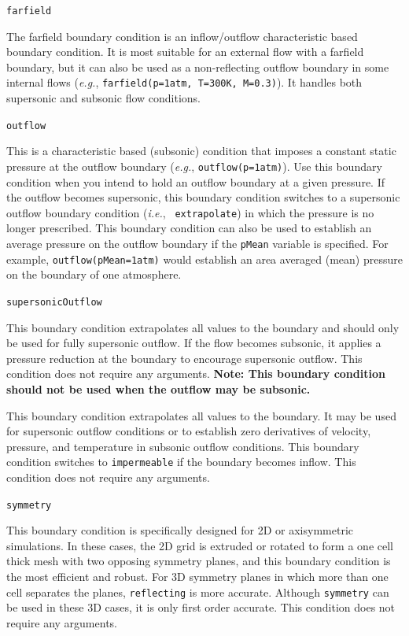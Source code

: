 \documentclass{article}
\begin{document}
\begin{list}{}{}
  \item {\tt farfield}

    The farfield boundary condition is an inflow/outflow
    characteristic based boundary condition.  It is most suitable for
    an external flow with a farfield boundary, but it can also be used
    as a non-reflecting outflow boundary in some internal flows
    ({\it{e.g.}}, {\tt farfield(p=1atm, T=300K, M=0.3)}).  It handles
    both supersonic and subsonic flow conditions.

  \item {\tt outflow}
    
    This is a characteristic based (subsonic) condition that imposes a
    constant static pressure at the outflow boundary ({\it{e.g.}},
    {\tt outflow(p=1atm)}).  Use this boundary condition when you
    intend to hold an outflow boundary at a given pressure.  If the
    outflow becomes supersonic, this boundary condition switches to a
    supersonic outflow boundary condition ({\it{i.e.}}, {\tt
      extrapolate}) in which the pressure is no longer prescribed.
    This boundary condition can also be used to establish an
    average pressure on the outflow boundary if the {\tt pMean}
    variable is specified.  For example, {\tt outflow(pMean=1atm)}
    would establish an area averaged (mean) pressure on the boundary of one
    atmosphere.

  \item {\tt supersonicOutflow}
    
    This boundary condition extrapolates all values to the boundary
    and should only be used for fully supersonic outflow.  If the flow
    becomes subsonic, it applies a pressure reduction at the boundary
    to encourage supersonic outflow.  This condition does not require
    any arguments.  {\bf Note: This boundary condition should not be
      used when the outflow may be subsonic.}


    This boundary condition extrapolates all values to the boundary.
    It may be used for supersonic outflow conditions or to establish
    zero derivatives of velocity, pressure, and temperature in
    subsonic outflow conditions.  This boundary condition switches to
    {\tt impermeable} if the boundary becomes inflow.  This condition
    does not require any arguments.

  \item {\tt symmetry}

    This boundary condition is specifically designed for 2D or
    axisymmetric simulations.  In these cases, the 2D grid is
    extruded or rotated to form a one cell thick mesh with two
    opposing symmetry planes, and this boundary condition is the most
    efficient and robust.  For 3D symmetry planes in which more than
    one cell separates the planes, {\tt reflecting} is more accurate.
    Although {\tt symmetry} can be used in these 3D cases, it is only
    first order accurate.  This condition does not require any
    arguments.


\end{list}
\end{document}
